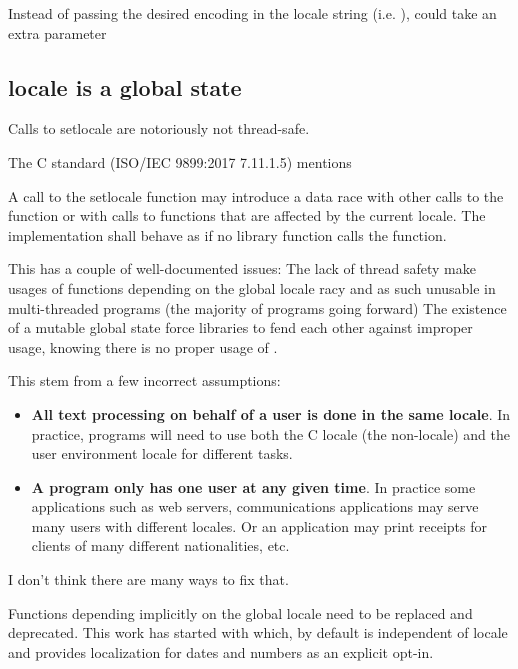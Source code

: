 \documentclass{wg21}
\begin{document}
Instead of passing the desired encoding in the locale string (i.e. ),  could take an extra parameter

\subsection{locale is a global state}
Calls to setlocale are notoriously not thread-safe.

The C standard (ISO/IEC 9899:2017 7.11.1.5) mentions

\begin{quoteblock}
A call to the setlocale function may introduce a data race with other calls to the  function or with calls to functions that are affected by the current locale. The implementation shall behave as if no library function calls the  function.
\end{quoteblock}

This has a couple of well-documented issues:
The lack of thread safety make usages of functions depending on the global locale racy and as such unusable in multi-threaded programs (the majority of programs going forward)
The existence of a mutable global state force libraries to fend each other against improper  usage, knowing there is no proper usage of .


This stem from a few incorrect assumptions:

\begin{itemize}
    \item \textbf{All text processing on behalf of a user is done in the same locale}. In practice, programs will need to use both the C locale (the non-locale) and the user environment locale for different tasks.
    \item \textbf{A program only has one user at any given time}. In practice some applications such as web servers, communications applications may serve many users with different locales. Or an application may print receipts for clients of many different nationalities, etc.
\end{itemize}



I don’t think there are many ways to fix that.

Functions depending implicitly on the global locale need to be replaced and deprecated.
This work has started with  which, by default is independent of locale and provides localization for dates and numbers as an explicit opt-in.
\end{document}
